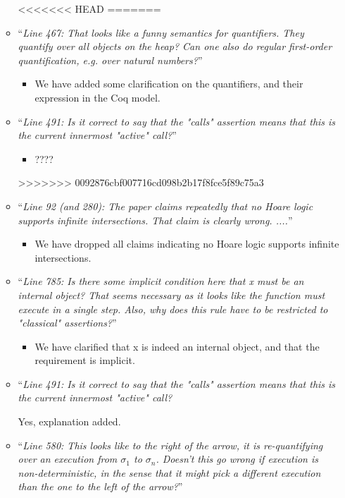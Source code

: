 \documentclass[11pt]{amsart}
\begin{document}
\begin{itemize}
\begin{itemize}
<<<<<<< HEAD
=======
\item
``\emph{Line 467: That looks like a funny semantics for quantifiers. They quantify over all objects on the heap? Can one also do regular first-order quantification, e.g. over natural numbers?}''
\begin{itemize}
\item
We have added some clarification on the quantifiers, and their expression in the Coq model.
\end{itemize}

\item
``\emph{Line 491: Is it correct to say that the "calls" assertion means that this is the current innermost "active" call?}''
\begin{itemize}
\item
????
\end{itemize}

>>>>>>> 0092876cbf007716cd098b2b17f8fce5f89c75a3
\item
``\emph{Line 92 (and 280): The paper claims repeatedly that no Hoare logic supports infinite intersections. That claim is clearly wrong. ....}''
\begin{itemize}
\item
We have dropped all claims indicating no Hoare logic supports infinite intersections.
\end{itemize}

\item
``\emph{Line 785: Is there some implicit condition here that x must be an internal object? That seems necessary as it looks like the function must execute in a single step. Also, why does this rule have to be restricted to "classical" assertions?}''
\begin{itemize}
\item
We have clarified that x is indeed an internal object, and that the requirement is implicit.
\end{itemize}

\item
``\emph{Line 491: Is it correct to say that the "calls" assertion means that this is the current innermost "active" call?}

Yes, explanation added.

\item
``\emph{Line 580: This looks like to the right of the arrow, it is re-quantifying over an execution from $\sigma_1$ to $\sigma_n$. Doesn't this go wrong if execution is non-deterministic, in the sense that it might pick a different execution than the one to the left of the arrow?}''
 

\end{itemize}
\end{itemize}
\end{document}
